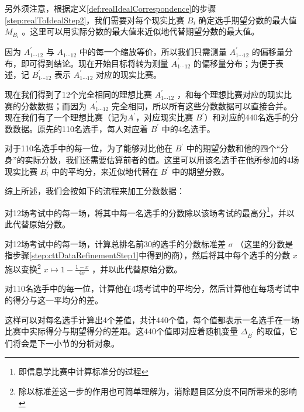         \vspace{1.5ex}

        另外须注意，根据定义\ref{def:realIdealCorrespondence}的步骤\ref{step:realToIdealStep2}，我们需要对每个现实比赛 $B_i$ 确定选手期望分数的最大值 $M_{B_i}$ 。这里可以用实际分数的最大值来近似地代替期望分数的最大值。
        
        因为 $A^{\prime}_{1\cdots 12}$ 与 $A_{1\cdots 12}$ 中的每一个缩放等价，所以我们只需测量 $A^{\prime}_{1\cdots 12}$ 的偏移量分布，即可得到结论。现在开始目标将转为测量 $A^{\prime}_{1\cdots 12}$ 的偏移量分布；为便于表述，记 $B^{\prime}_{1\cdots 12}$ 表示 $A^{\prime}_{1\cdots 12}$ 对应的现实比赛。

        现在我们得到了12个完全相同的理想比赛 $A^{\prime}_{1\cdots 12}$ ，和每个理想比赛对应的现实比赛的分数数据；而因为 $A^{\prime}_{1\cdots 12}$ 完全相同，所以所有这些分数数据可以直接合并。现在我们有了一个理想比赛（记为$A^{\prime}$，对应现实比赛 $B^{\prime}$）和对应的440名选手的分数数据。原先的110名选手，每人对应着 $B^{\prime}$ 中的4名选手。

        对于110名选手中的每一位，为了能够对比他在 $B^{\prime}$ 中的期望分数和他的四个“分身”的实际分数，我们还需要估算前者的值。这里可以用该名选手在他所参加的4场现实比赛 $B^{\prime}_i$ 中的平均分，来近似地代替在 $B^{\prime}$ 中的期望分数。

        \vspace{1.5ex}

        综上所述，我们会按如下的流程来加工分数数据：
        \begin{asparaenum}[\bfseries{步骤} 1.]
            \item \label{step:cttDataRefinementStep1} 对12场考试中的每一场，将其中每一名选手的分数除以该场考试的最高分\footnote{即信息学比赛中计算标准分的过程}，并以此代替原始分数。
            \item 对12场考试中的每一场，计算总排名前30的选手的分数标准差 $\sigma$ （这里的分数是指步骤\ref{step:cttDataRefinementStep1}中得到的商），然后将其中每个选手的分数 $x$ 施以变换\footnote{除以标准差这一步的作用也可简单理解为，消除题目区分度不同所带来的影响} $x\mapsto 1-\frac{1-x}{4\sigma}$ ，并以此代替原始分数。
            \item 对110名选手中的每一位，计算他在4场考试中的平均分，然后计算他在每场考试中的得分与这一平均分的差。
        \end{asparaenum}

        \vspace{1.5ex}

        这样可以对每名选手计算出4个差值，共计440个值，每个值都表示一名选手在一场比赛中实际得分与期望得分的差距。这440个值即对应着随机变量 $\Delta_{B^{\prime}}$ 的取值，它们将会是下一小节的分析对象。

